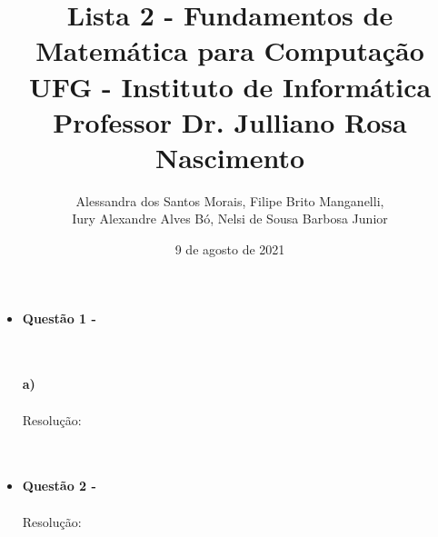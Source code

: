 \documentclass[a4paper,12pt]{article}
\begin{document}
\title{\textbf{Lista 2 - Fundamentos de Matemática para Computação} \\\vspace{5}\small UFG - Instituto de Informática\\\large Professor Dr. Julliano Rosa Nascimento}
\author{Alessandra dos Santos Morais, Filipe Brito Manganelli,\\Iury Alexandre Alves Bó, Nelsi de Sousa Barbosa Junior}
\date{9 de agosto de 2021}
\maketitle

\begin{itemize} %
    \item [] \textbf{Questão 1 -} %
     
     \\\\\textbf{a)} %
     \\\\Resolução:
     \\\\ %
    
     
     \\ %
     
     \item [] \textbf{Questão 2 -}
     \\\\Resolução:
     \\\\
     
     
     \\
     
     

\end{itemize}
    
\end{document}
